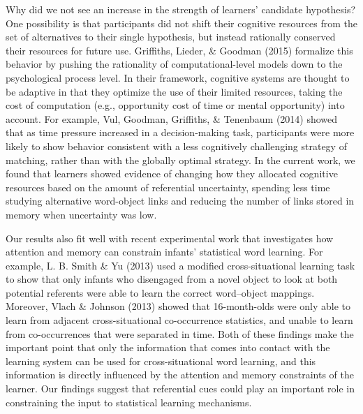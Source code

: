 \documentclass[authoryear, review]{elsarticle}
\begin{document}
Why did we not see an increase in the strength of learners' candidate
hypothesis? One possibility is that participants did not shift their
cognitive resources from the set of alternatives to their single
hypothesis, but instead rationally conserved their resources for future
use. Griffiths, Lieder, \& Goodman (2015) formalize this behavior by
pushing the rationality of computational-level models down to the
psychological process level. In their framework, cognitive systems are
thought to be adaptive in that they optimize the use of their limited
resources, taking the cost of computation (e.g., opportunity cost of
time or mental opportunity) into account. For example, Vul, Goodman,
Griffiths, \& Tenenbaum (2014) showed that as time pressure increased in
a decision-making task, participants were more likely to show behavior
consistent with a less cognitively challenging strategy of matching,
rather than with the globally optimal strategy. In the current work, we
found that learners showed evidence of changing how they allocated
cognitive resources based on the amount of referential uncertainty,
spending less time studying alternative word-object links and reducing
the number of links stored in memory when uncertainty was low.

Our results also fit well with recent experimental work that
investigates how attention and memory can constrain infants' statistical
word learning. For example, L. B. Smith \& Yu (2013) used a modified
cross-situational learning task to show that only infants who disengaged
from a novel object to look at both potential referents were able to
learn the correct word--object mappings. Moreover, Vlach \& Johnson
(2013) showed that 16-month-olds were only able to learn from adjacent
cross-situational co-occurrence statistics, and unable to learn from
co-occurrences that were separated in time. Both of these findings make
the important point that only the information that comes into contact
with the learning system can be used for cross-situational word
learning, and this information is directly influenced by the attention
and memory constraints of the learner. Our findings suggest that
referential cues could play an important role in constraining the input
to statistical learning mechanisms.
\end{document}
